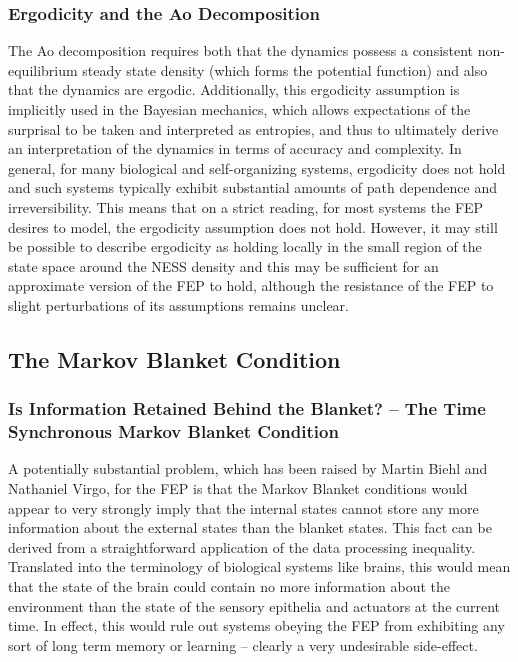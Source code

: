 \subsubsection{Ergodicity and the Ao Decomposition}

The Ao decomposition requires both that the dynamics possess a consistent non-equilibrium steady state density (which forms the potential function) and also that the dynamics are ergodic. Additionally, this ergodicity assumption is implicitly used in the Bayesian mechanics, which allows expectations of the surprisal to be taken and interpreted as entropies, and thus to ultimately derive an interpretation of the dynamics in terms of accuracy and complexity. In general, for many biological and self-organizing systems, ergodicity does not hold and such systems typically exhibit substantial amounts of path dependence and irreversibility. This means that on a strict reading, for most systems the FEP desires to model, the ergodicity assumption does not hold. However, it may still be possible to describe ergodicity as holding locally in the small region of the state space around the NESS density and this may be sufficient for an approximate version of the FEP to hold, although the resistance of the FEP to slight perturbations of its assumptions remains unclear.

\subsection{The Markov Blanket Condition}
\subsubsection{Is Information Retained Behind the Blanket? -- The Time Synchronous Markov Blanket Condition}

A potentially substantial problem, which has been raised by Martin Biehl and Nathaniel Virgo, for the FEP is that the Markov Blanket conditions would appear to very strongly imply that the internal states cannot store any more information about the external states than the blanket states. This fact can be derived from a straightforward application of the data processing inequality. Translated into the terminology of biological systems like brains, this would mean that the state of the brain could contain no more information about the environment than the state of the sensory epithelia and actuators at the current time. In effect, this would rule out systems obeying the FEP from exhibiting any sort of long term memory or learning -- clearly a very undesirable side-effect. 

